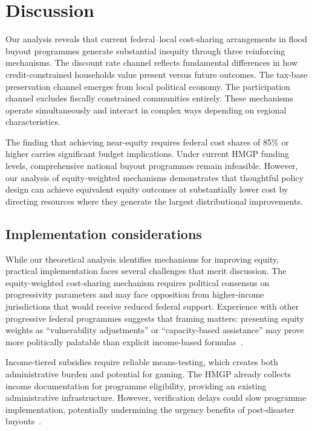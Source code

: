 \documentclass[11pt,letterpaper]{article}
\theoremstyle{definition}
\begin{document}
\section*{Discussion}

Our analysis reveals that current federal--local cost-sharing arrangements in flood buyout programmes generate substantial inequity through three reinforcing mechanisms. The discount rate channel reflects fundamental differences in how credit-constrained households value present versus future outcomes. The tax-base preservation channel emerges from local political economy. The participation channel excludes fiscally constrained communities entirely. These mechanisms operate simultaneously and interact in complex ways depending on regional characteristics.

The finding that achieving near-equity requires federal cost shares of 85\% or higher carries significant budget implications. Under current HMGP funding levels, comprehensive national buyout programmes remain infeasible. However, our analysis of equity-weighted mechanisms demonstrates that thoughtful policy design can achieve equivalent equity outcomes at substantially lower cost by directing resources where they generate the largest distributional improvements.

\subsection*{Implementation considerations}

While our theoretical analysis identifies mechanisms for improving equity, practical implementation faces several challenges that merit discussion. The equity-weighted cost-sharing mechanism requires political consensus on progressivity parameters and may face opposition from higher-income jurisdictions that would receive reduced federal support. Experience with other progressive federal programmes suggests that framing matters: presenting equity weights as ``vulnerability adjustments'' or ``capacity-based assistance'' may prove more politically palatable than explicit income-based formulas~\cite{banzhaf2019environmental}.

Income-tiered subsidies require reliable means-testing, which creates both administrative burden and potential for gaming. The HMGP already collects income documentation for programme eligibility, providing an existing administrative infrastructure. However, verification delays could slow programme implementation, potentially undermining the urgency benefits of post-disaster buyouts~\cite{binder2015framework}.
\end{document}
